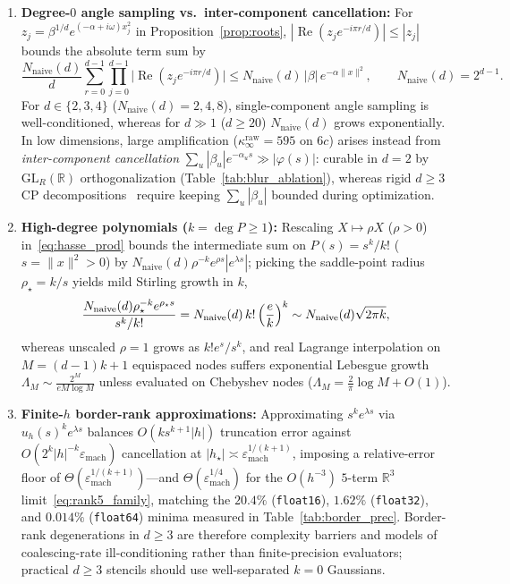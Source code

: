 \documentclass[11pt,a4paper]{article}
\theoremstyle{plain}
\theoremstyle{definition}
\newcommand{\R}{\mathbb{R}}
\newcommand{\Nnaive}{N_{\mathrm{naive}}}
\DeclareMathOperator{\RePart}{Re}
\begin{document}
\begin{enumerate}[leftmargin=2em,itemsep=2pt]
  \item \textbf{Degree-$0$ angle sampling vs.\ inter-component cancellation:} For $z_j = \beta^{1/d} e^{(-\alpha + i\omega)x_j^2}$ in Proposition~\ref{prop:roots}, $|\RePart(z_j e^{-i\pi r/d})| \le |z_j|$ bounds the absolute term sum by
  \begin{equation}\label{eq:amp_k0}
    \frac{\Nnaive(d)}{d}\sum_{r=0}^{d-1} \prod_{j=0}^{d-1} \bigl|\RePart(z_j e^{-i\pi r/d})\bigr|
    \le \Nnaive(d)\,|\beta|\,e^{-\alpha\|x\|^2}, \qquad \Nnaive(d) = 2^{d-1}.
  \end{equation}
  For $d \in \{2, 3, 4\}$ ($\Nnaive(d) = 2, 4, 8$), single-component angle sampling is well-conditioned, whereas for $d \gg 1$ ($d \ge 20$) $\Nnaive(d)$ grows exponentially. In low dimensions, large amplification ($\kappa_\infty^{\mathrm{raw}} = 595$ on $6c$) arises instead from \emph{inter-component cancellation} $\sum_u |\beta_u|e^{-\alpha_u s} \gg |\varphi(s)|$: curable in $d = 2$ by $\mathrm{GL}_R(\R)$ orthogonalization (Table~\ref{tab:blur_ablation}), whereas rigid $d \ge 3$ CP decompositions~\cite{kruskal1977three} require keeping $\sum_u |\beta_u|$ bounded during optimization.
  \item \textbf{High-degree polynomials ($k = \deg P \ge 1$):} Rescaling $X \mapsto \rho X$ ($\rho > 0$) in~\eqref{eq:hasse_prod} bounds the intermediate sum on $P(s) = s^k/k!$ ($s = \|x\|^2 > 0$) by $\Nnaive(d)\rho^{-k} e^{\rho s}|e^{\lambda s}|$; picking the saddle-point radius $\rho_\star = k/s$ yields mild Stirling growth in $k$,
  \begin{equation}\label{eq:amp_poly}
    \frac{\Nnaive(d)\rho_\star^{-k} e^{\rho_\star s}}{s^k / k!} = \Nnaive(d)\, k!\,\Bigl(\frac{e}{k}\Bigr)^k \sim \Nnaive(d)\sqrt{2\pi k},
  \end{equation}
  whereas unscaled $\rho = 1$ grows as $k! e^s / s^k$, and real Lagrange interpolation on $M = (d - 1)k + 1$ equispaced nodes suffers exponential Lebesgue growth $\Lambda_M \sim \frac{2^M}{e M \log M}$ unless evaluated on Chebyshev nodes ($\Lambda_M = \frac{2}{\pi}\log M + O(1)$).
  \item \textbf{Finite-$h$ border-rank approximations:} Approximating $s^k e^{\lambda s}$ via $u_h(s)^k e^{\lambda s}$ balances $O(k s^{k+1}|h|)$ truncation error against $O(2^k |h|^{-k}\varepsilon_{\mathrm{mach}})$ cancellation at $|h_\star| \asymp \varepsilon_{\mathrm{mach}}^{1/(k+1)}$, imposing a relative-error floor of $\Theta(\varepsilon_{\mathrm{mach}}^{1/(k+1)})$---and $\Theta(\varepsilon_{\mathrm{mach}}^{1/4})$ for the $O(h^{-3})$ $5$-term $\R^3$ limit~\eqref{eq:rank5_family}, matching the $20.4\%$ (\texttt{float16}), $1.62\%$ (\texttt{float32}), and $0.014\%$ (\texttt{float64}) minima measured in Table~\ref{tab:border_prec}. Border-rank degenerations in $d \ge 3$ are therefore complexity barriers and models of coalescing-rate ill-conditioning rather than finite-precision evaluators; practical $d \ge 3$ stencils should use well-separated $k = 0$ Gaussians.
\end{enumerate}
\end{document}
